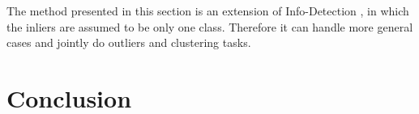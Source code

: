 The method presented in this section is an extension of Info-Detection \citep{zhao2019info}, in which the inliers are assumed to be only one class. Therefore it can handle more general cases and
jointly do outliers and clustering tasks.

\section{Conclusion}\label{sec:conc}



%
%



%
%
\appendix
